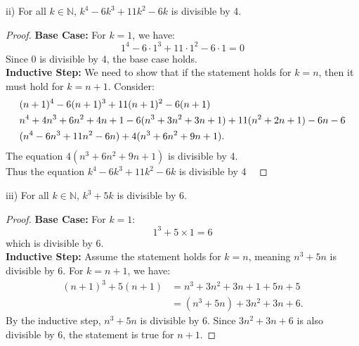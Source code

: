 \documentclass[12pt]{article}
\newenvironment{customprop}[1]{
  \renewcommand\theproposition{#1}
  \proposition
}{\endproposition}
\begin{document}
\pagestyle{fancy}
\fancyhf{} %
\setlength{\headheight}{41.54604pt}
\addtolength{\topmargin}{-27.04604pt}



\begin{customprop}{2.18}
  (ii) For all \( k \in \mathbb{N} \), \( k^4 - 6k^3 + 11k^2 - 6k \) is divisible by 4.
\end{customprop}

\begin{proof}
  \textbf{Base Case:} For \(k = 1\), we have:
  \[1^4 - 6 \cdot 1^3 + 11 \cdot 1^2 - 6 \cdot 1 = 0\]
  Since 0 is divisible by 4, the base case holds. \\
  
  \noindent \textbf{Inductive Step:} We need to show that if the statement holds for \(k = n\), then it must hold for \(k = n + 1\). Consider:
  \begin{align*}
    \centering
     & (n + 1)^4 - 6(n + 1)^3 + 11(n + 1)^2 - 6(n + 1)                                 \\
     & n^4 + 4n^3 + 6n^2 + 4n + 1 - 6(n^3 + 3n^2 + 3n + 1) + 11(n^2 + 2n + 1) - 6n - 6 \\
     & (n^4 - 6n^3 + 11n^2 - 6n) + 4(n^3 + 6n^2 + 9n + 1).
  \end{align*}
  The equation \(4(n^3 + 6n^2 + 9n + 1)\) is divisible by 4. \\

  \noindent Thus the equation \( k^4 - 6k^3 + 11k^2 - 6k \) is divisible by 4 \
\end{proof}


\begin{customprop}{2.18}
  (iii) For all \( k \in \mathbb{N} \), \( k^3 + 5k \) is divisible by 6.
\end{customprop}

\begin{proof}
  \textbf{Base Case:} For \(k = 1\):
  \[1^3 + 5 \times 1 = 6\]
  which is divisible by 6. \\
  
  \noindent \textbf{Inductive Step:} Assume the statement holds for \(k = n\), meaning \(n^3 + 5n\) is divisible by 6. For \(k = n + 1\), we have:
  \begin{align*}
  (n + 1)^3 + 5(n + 1) &= n^3 + 3n^2 + 3n + 1 + 5n + 5 \\
  &= (n^3 + 5n) + 3n^2 + 3n + 6. 
  \end{align*}
  By the inductive step, \(n^3 + 5n\) is divisible by 6. Since \(3n^2 + 3n + 6\) is also divisible by 6, the statement is true for \(n + 1\).
\end{proof}
\end{document}
